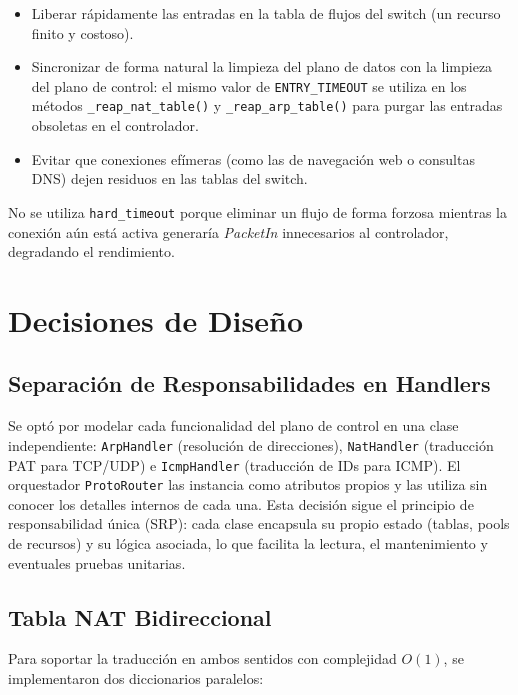\documentclass[11pt, a4paper]{article}
\begin{document}
\begin{itemize}
    \item Liberar rápidamente las entradas en la tabla de flujos del switch (un recurso finito y costoso).
    \item Sincronizar de forma natural la limpieza del plano de datos con la limpieza del plano de control: el mismo valor de \texttt{ENTRY\_TIMEOUT} se utiliza en los métodos \texttt{\_reap\_nat\_table()} y \texttt{\_reap\_arp\_table()} para purgar las entradas obsoletas en el controlador.
    \item Evitar que conexiones efímeras (como las de navegación web o consultas DNS) dejen residuos en las tablas del switch.
\end{itemize}

No se utiliza \texttt{hard\_timeout} porque eliminar un flujo de forma forzosa mientras la conexión aún está activa generaría \textit{PacketIn} innecesarios al controlador, degradando el rendimiento.


\section{Decisiones de Diseño}
\label{sec:decisiones_diseno}

\subsection{Separación de Responsabilidades en Handlers}
\label{subsec:handlers}

Se optó por modelar cada funcionalidad del plano de control en una clase independiente: \texttt{ArpHandler} (resolución de direcciones), \texttt{NatHandler} (traducción PAT para TCP/UDP) e \texttt{IcmpHandler} (traducción de IDs para ICMP). El orquestador \texttt{ProtoRouter} las instancia como atributos propios y las utiliza sin conocer los detalles internos de cada una. Esta decisión sigue el principio de responsabilidad única (SRP): cada clase encapsula su propio estado (tablas, pools de recursos) y su lógica asociada, lo que facilita la lectura, el mantenimiento y eventuales pruebas unitarias.

\subsection{Tabla NAT Bidireccional}
\label{subsec:tabla_bidireccional}

Para soportar la traducción en ambos sentidos con complejidad $O(1)$, se implementaron dos diccionarios paralelos:
\end{document}
